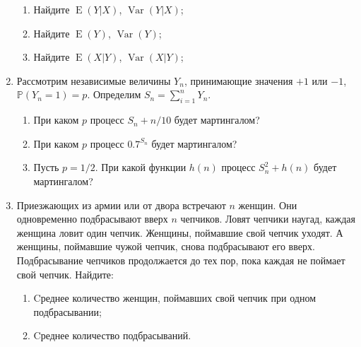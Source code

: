 \documentclass[11pt]{article}
\DeclareMathOperator{\Var}{Var}
\DeclareMathOperator{\E}{E}
\renewcommand{\P}{\mathbb{P}}
\begin{document}
\begin{enumerate}
\begin{enumerate}
  \item Найдите $\E(Y|X)$, $\Var(Y|X)$;
  \item Найдите $\E(Y)$, $\Var(Y)$;
  \item Найдите $\E(X|Y)$, $\Var(X|Y)$;
\end{enumerate}


\item Рассмотрим независимые величины $Y_n$, принимающие значения $+1$ или $-1$, $\P(Y_n = 1) = p$.
Определим $S_n=\sum_{i=1}^n Y_n$.

\begin{enumerate}
  \item При каком $p$ процесс $S_n+n/10$ будет мартингалом?
  \item При каком $p$ процесс $0.7^{S_n}$ будет мартингалом?
  \item Пусть $p=1/2$. При какой функции $h(n)$ процесс $S_n^2 + h(n)$ будет мартингалом?
\end{enumerate}


\item Приезжающих из армии или от двора встречают $n$ женщин. Они одновременно подбрасывают
вверх $n$ чепчиков. Ловят чепчики наугад, каждая женщина ловит один чепчик. Женщины,
поймавшие свой чепчик уходят. А женщины, поймавшие чужой чепчик, снова подбрасывают его
вверх. Подбрасывание чепчиков продолжается до тех пор, пока каждая не поймает свой чепчик.
Найдите:

\begin{enumerate}
  \item Cреднее количество женщин, поймавших свой чепчик при одном подбрасывании;
  \item Cреднее количество подбрасываний.
\end{enumerate}



\end{enumerate}
\end{document}
